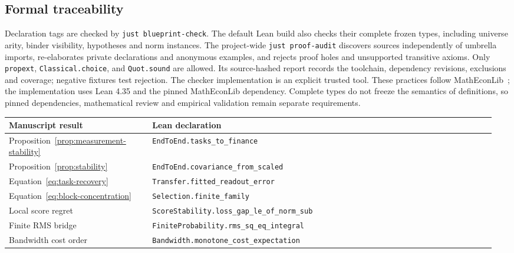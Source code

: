 \documentclass[11pt]{article}
\begin{document}
\subsection{Formal traceability}\label{app:traceability}
Declaration tags are checked by \texttt{just blueprint-check}. The default
Lean build also checks their complete frozen types, including universe arity,
binder visibility, hypotheses and norm instances. The project-wide
\texttt{just proof-audit} discovers sources independently of umbrella imports,
re-elaborates private declarations and anonymous examples, and rejects proof
holes and unsupported transitive axioms. Only \texttt{propext},
\texttt{Classical.choice}, and \texttt{Quot.sound} are allowed. Its
source-hashed
report records the toolchain, dependency revisions, exclusions and coverage;
negative fixtures test rejection. The checker implementation is an explicit
trusted tool. These practices follow MathEconLib~\cite{matheconlib}; the
implementation uses Lean 4.35 and the pinned MathEconLib dependency.
Complete types do not freeze the
semantics of definitions, so pinned dependencies, mathematical review and
empirical validation remain separate requirements.
\begin{center}\small
  \begin{tabular}{@{}p{0.29\linewidth}p{0.67\linewidth}@{}}
    \toprule
    Manuscript result & Lean declaration\\
    \midrule
    Proposition~\ref{prop:measurement-stability} &
    \texttt{EndToEnd.tasks\_to\_finance}\\
    Proposition~\ref{prop:stability} &
    \texttt{EndToEnd.covariance\_from\_scaled}\\
    Equation~\eqref{eq:task-recovery} &
    \texttt{Transfer.fitted\_readout\_error}\\
    Equation~\eqref{eq:block-concentration} &
    \texttt{Selection.finite\_family}\\
    Local score regret & \texttt{ScoreStability.loss\_gap\_le\_of\_norm\_sub}\\
    Finite RMS bridge & \texttt{FiniteProbability.rms\_sq\_eq\_integral}\\
    Bandwidth cost order & \texttt{Bandwidth.monotone\_cost\_expectation}\\
    \bottomrule
  \end{tabular}
\end{center}
\end{document}
